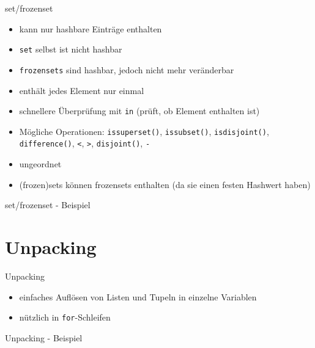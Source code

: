 \begin{frame}{set/frozenset}
	\begin{itemize}
		\item kann nur hashbare Einträge enthalten
		\item \texttt{set} selbst ist nicht hashbar
		\item \texttt{frozensets} sind hashbar, jedoch nicht mehr veränderbar
		\item enthält jedes Element nur einmal
		\item schnellere Überprüfung mit \alert{\texttt{in}} (prüft, ob Element enthalten ist)
		\item Mögliche Operationen: \alert{\texttt{issuperset()}}, \alert{\texttt{issubset()}}, \alert{\texttt{isdisjoint()}}, \alert{\texttt{difference()}}, \alert{\texttt{<}}, \alert{\texttt{>}}, \alert{\texttt{disjoint()}}, \alert{\texttt{-}}
		\item ungeordnet
		\item (frozen)sets können frozensets enthalten (da sie einen festen Hashwert haben)
	\end{itemize}
\end{frame}

\begin{frame}{set/frozenset - Beispiel}
	
\end{frame}


\section{Unpacking}

\begin{frame}{Unpacking}
	\begin{itemize}
		\item einfaches Auflösen von Listen und Tupeln in einzelne Variablen
		\item nützlich in \alert{\texttt{for}}-Schleifen
	\end{itemize}
\end{frame}

\begin{frame}{Unpacking - Beispiel}
	
\end{frame}


